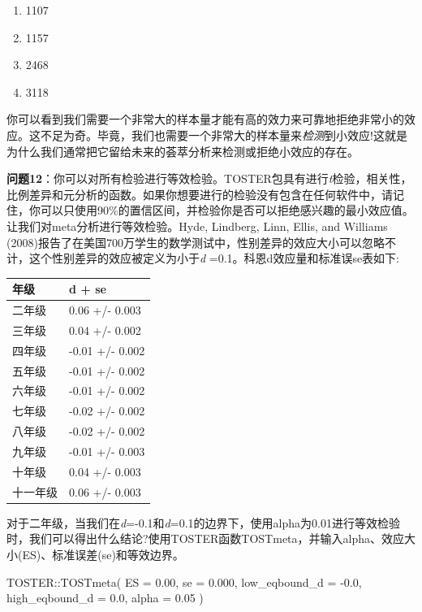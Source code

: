 \documentclass[
  letterpaper,
  DIV=11,
  numbers=noendperiod]{scrreprt}
\newenvironment{Shaded}{\begin{snugshade}}{\end{snugshade}}
\newcommand{\AttributeTok}[1]{\textcolor[rgb]{0.40,0.45,0.13}{#1}}
\newcommand{\FloatTok}[1]{\textcolor[rgb]{0.68,0.00,0.00}{#1}}
\newcommand{\FunctionTok}[1]{\textcolor[rgb]{0.28,0.35,0.67}{#1}}
\newcommand{\NormalTok}[1]{\textcolor[rgb]{0.00,0.23,0.31}{#1}}
\newcommand{\SpecialCharTok}[1]{\textcolor[rgb]{0.37,0.37,0.37}{#1}}
\providecommand{\tightlist}{%
  \setlength{\itemsep}{0pt}\setlength{\parskip}{0pt}}\usepackage{longtable,booktabs,array}
\begin{document}
\begin{enumerate}
\def\labelenumi{\Alph{enumi})}
\tightlist
\item
  1107
\item
  1157
\item
  2468
\item
  3118
\end{enumerate}

你可以看到我们需要一个非常大的样本量才能有高的效力来可靠地拒绝非常小的效应。这不足为奇。毕竟，我们也需要一个非常大的样本量来\emph{检测}到小效应!这就是为什么我们通常把它留给未来的荟萃分析来检测或拒绝小效应的存在。

\textbf{问题12}：你可以对所有检验进行等效检验。TOSTER包具有进行\emph{t}检验，相关性，比例差异和元分析的函数。如果你想要进行的检验没有包含在任何软件中，请记住，你可以只使用90\%的置信区间，并检验你是否可以拒绝感兴趣的最小效应值。让我们对meta分析进行等效检验。Hyde,
Lindberg, Linn, Ellis, and Williams
(2008)报告了在美国700万学生的数学测试中，性别差异的效应大小可以忽略不计，这个性别差异的效应被定义为小于\emph{d}
=0.1。科恩d效应量和标准误se表如下:

\begin{longtable}[]{@{}ll@{}}
\toprule\noalign{}
\textbf{年级} & \textbf{d + se} \\
\midrule\noalign{}
\endhead
\bottomrule\noalign{}
\endlastfoot
二年级 & 0.06 +/- 0.003 \\
三年级 & 0.04 +/- 0.002 \\
四年级 & -0.01 +/- 0.002 \\
五年级 & -0.01 +/- 0.002 \\
六年级 & -0.01 +/- 0.002 \\
七年级 & -0.02 +/- 0.002 \\
八年级 & -0.02 +/- 0.002 \\
九年级 & -0.01 +/- 0.003 \\
十年级 & 0.04 +/- 0.003 \\
十一年级 & 0.06 +/- 0.003 \\
\end{longtable}

对于二年级，当我们在\emph{d}=-0.1和\emph{d}=0.1的边界下，使用alpha为0.01进行等效检验时，我们可以得出什么结论?使用TOSTER函数TOSTmeta，并输入alpha、效应大小(ES)、标准误差(se)和等效边界。

\begin{Shaded}
\begin{Highlighting}[]
\NormalTok{TOSTER}\SpecialCharTok{::}\FunctionTok{TOSTmeta}\NormalTok{(}
  \AttributeTok{ES =} \FloatTok{0.00}\NormalTok{,}
  \AttributeTok{se =} \FloatTok{0.000}\NormalTok{,}
  \AttributeTok{low\_eqbound\_d =} \SpecialCharTok{{-}}\FloatTok{0.0}\NormalTok{,}
  \AttributeTok{high\_eqbound\_d =} \FloatTok{0.0}\NormalTok{,}
  \AttributeTok{alpha =} \FloatTok{0.05}
\NormalTok{)}
\end{Highlighting}
\end{Shaded}
\end{document}
